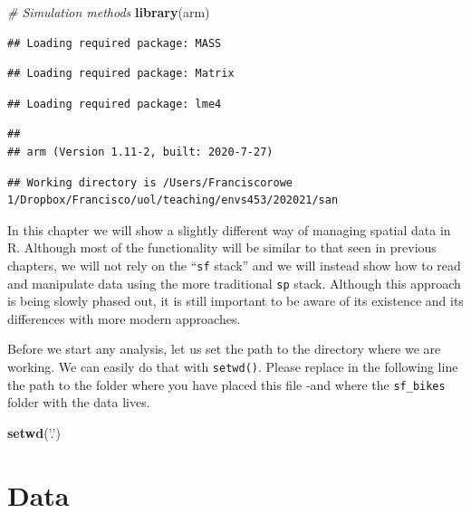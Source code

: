 \documentclass[
]{book}
\newenvironment{Shaded}{\begin{snugshade}}{\end{snugshade}}
\newcommand{\CommentTok}[1]{\textcolor[rgb]{0.56,0.35,0.01}{\textit{#1}}}
\newcommand{\KeywordTok}[1]{\textcolor[rgb]{0.13,0.29,0.53}{\textbf{#1}}}
\newcommand{\NormalTok}[1]{#1}
\newcommand{\StringTok}[1]{\textcolor[rgb]{0.31,0.60,0.02}{#1}}
\begin{document}
\begin{Shaded}
\begin{Highlighting}[]
\CommentTok{# Simulation methods}
\KeywordTok{library}\NormalTok{(arm)}
\end{Highlighting}
\end{Shaded}

\begin{verbatim}
## Loading required package: MASS
\end{verbatim}

\begin{verbatim}
## Loading required package: Matrix
\end{verbatim}

\begin{verbatim}
## Loading required package: lme4
\end{verbatim}

\begin{verbatim}
## 
## arm (Version 1.11-2, built: 2020-7-27)
\end{verbatim}

\begin{verbatim}
## Working directory is /Users/Franciscorowe 1/Dropbox/Francisco/uol/teaching/envs453/202021/san
\end{verbatim}

In this chapter we will show a slightly different way of managing spatial data in R. Although most of the functionality will be similar to that seen in previous chapters, we will not rely on the ``\texttt{sf} stack'' and we will instead show how to read and manipulate data using the more traditional \texttt{sp} stack. Although this approach is being slowly phased out, it is still important to be aware of its existence and its differences with more modern approaches.

Before we start any analysis, let us set the path to the directory where we are working. We can easily do that with \texttt{setwd()}. Please replace in the following line the path to the folder where you have placed this file -and where the \texttt{sf\_bikes} folder with the data lives.

\begin{Shaded}
\begin{Highlighting}[]
\KeywordTok{setwd}\NormalTok{(}\StringTok{'.'}\NormalTok{)}
\end{Highlighting}
\end{Shaded}

\hypertarget{data-1}{%
\section{Data}\label{data-1}}
\end{document}
